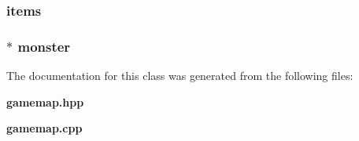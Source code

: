 \subsubsection{ {\bf items}}\label{classMapSquare_o1}


\subsubsection{$\ast$ {\bf monster}}\label{classMapSquare_o2}




The documentation for this class was generated from the following files:\begin{CompactItemize}
\item 
{\bf gamemap.hpp}\item 
{\bf gamemap.cpp}\end{CompactItemize}
